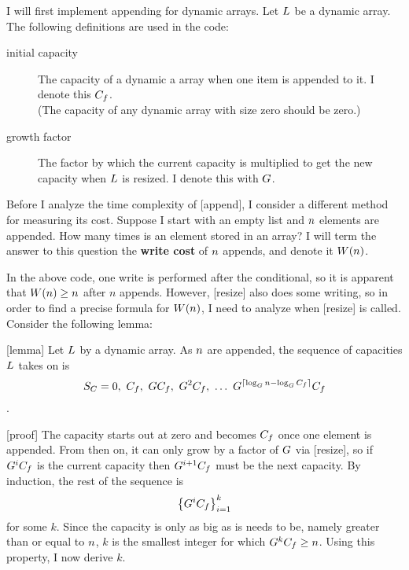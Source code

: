\dynarrayimpl

I will first implement appending for dynamic arrays. Let $L$ be a dynamic array. The following definitions are used in the code:

\begin{description}
	\item[initial capacity] The capacity of a dynamic a array when one item is appended to it. I denote this $C_f$.\\
	(The capacity of any dynamic array with size zero should be zero.)
	\item[growth factor] The factor by which the current capacity is multiplied to get the new capacity when $L$ is resized. I denote this with $G$.
\end{description}


\tcomplex

Before I analyze the time complexity of [append], I consider a different method for measuring its cost. Suppose I start with an empty list and $n$ elements are appended. How many times is an element stored in an array? I will term the answer to this question the \textbf{write cost} of $n$ appends, and denote it $W(n)$.

In the above code, one write is performed after the conditional, so it is apparent that $W(n) \geq n$ after $n$ appends. However, [resize] also does some writing, so in order to find a precise formula for $W(n)$, I need to analyze when [resize] is called. Consider the following lemma:

[lemma]
Let $L$ by a dynamic array. As $n$ are appended, the sequence of capacities $L$ takes on is $$S_C = 0,\ \initcapacity,\ \growthfactor\initcapacity,\ \growthfactor^2\initcapacity,\ \ldots\ \growthfactor^{\lceil \log_{\growthfactor} \varnitems - \log_{\growthfactor} \initcapacity \rceil}\initcapacity$$.

[proof]
The capacity starts out at zero and becomes $C_f$ once one element is appended. From then on, it can only grow by a factor of $G$ via [resize], so if $G^iC_f$ is the current capacity then $G^{i + 1}C_f$ must be the next capacity. By induction, the rest of the sequence is $$\left\{ G^iC_f \right\}_{i = 1}^k$$ for some $k$. Since the capacity is only as big as is needs to be, namely greater than or equal to $n$, $k$ is the smallest integer for which $G^kC_f \geq n$. Using this property, I now derive $k$.


